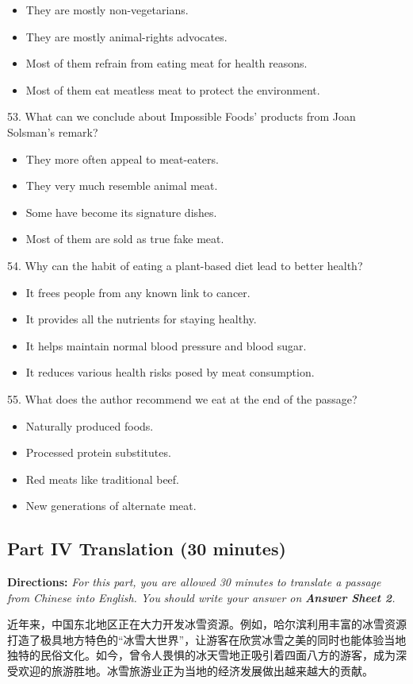 \documentclass[UTF8,11pt]{ctexart}
\begin{document}
\begin{itemize}[leftmargin=2em,itemsep=.2em,topsep=.4em]\item[A.] They are mostly non-vegetarians.
\item[B.] They are mostly animal-rights advocates.
\item[C.] Most of them refrain from eating meat for health reasons.
\item[D.] Most of them eat meatless meat to protect the environment.
\end{itemize}

53. What can we conclude about Impossible Foods’ products from Joan Solsman’s remark?


\begin{itemize}[leftmargin=2em,itemsep=.2em,topsep=.4em]\item[A.] They more often appeal to meat-eaters.
\item[B.] They very much resemble animal meat.
\item[C.] Some have become its signature dishes.
\item[D.] Most of them are sold as true fake meat.
\end{itemize}

54. Why can the habit of eating a plant-based diet lead to better health?


\begin{itemize}[leftmargin=2em,itemsep=.2em,topsep=.4em]\item[A.] It frees people from any known link to cancer.
\item[B.] It provides all the nutrients for staying healthy.
\item[C.] It helps maintain normal blood pressure and blood sugar.
\item[D.] It reduces various health risks posed by meat consumption.
\end{itemize}

55. What does the author recommend we eat at the end of the passage?


\begin{itemize}[leftmargin=2em,itemsep=.2em,topsep=.4em]\item[A.] Naturally produced foods.
\item[B.] Processed protein substitutes.
\item[C.] Red meats like traditional beef.
\item[D.] New generations of alternate meat.
\end{itemize}

\subsection*{\textbf{Part IV Translation (30 minutes)}}


\textbf{Directions: }\textit{For this part, you are allowed 30 minutes to translate a passage from Chinese into English. You} \textit{should write your answer on }\textbf{\textit{Answer Sheet 2}}\textit{.}


近年来，中国东北地区正在大力开发冰雪资源。例如，哈尔滨利用丰富的冰雪资源打造了极具地方特色的“冰雪大世界”，让游客在欣赏冰雪之美的同时也能体验当地独特的民俗文化。如今，曾令人畏惧的冰天雪地正吸引着四面八方的游客，成为深受欢迎的旅游胜地。冰雪旅游业正为当地的经济发展做出越来越大的贡献。
\end{document}
